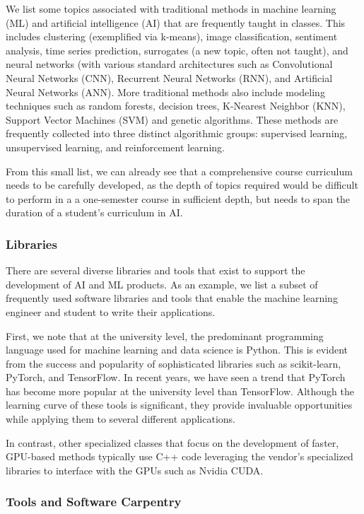 \documentclass[utf8]{FrontiersinVancouver} %
\begin{document}
We list some topics associated with traditional methods in machine
learning (ML) and artificial intelligence (AI) that are frequently
taught in classes. This includes clustering (exemplified via k-means),
image classification, sentiment analysis, time series prediction,
surrogates (a new topic, often not taught), and neural networks (with
various standard architectures such as Convolutional Neural Networks
(CNN), Recurrent Neural Networks (RNN), and Artificial Neural Networks
(ANN).  More traditional methods also include modeling techniques such
as random forests, decision trees, K-Nearest Neighbor (KNN), Support
Vector Machines (SVM) and genetic algorithms.  These methods are
frequently collected into three distinct algorithmic groups:
supervised learning, unsupervised learning, and reinforcement
learning.

From this small list, we can already see that a comprehensive course
curriculum needs to be carefully developed, as the depth of topics required would be difficult to perform in a
a one-semester course in sufficient depth, but needs to span the
duration of a student's curriculum in AI.

\subsubsection{Libraries}

There are several diverse libraries and tools that exist to support
the development of AI and ML products.  As an example, we list a
subset of frequently used software libraries and tools that enable the
machine learning engineer and student to write their applications.

First, we note that at the university level, the predominant
programming language used for machine learning and data science is
Python. This is evident from the success and popularity of
sophisticated libraries such as scikit-learn, PyTorch, and
TensorFlow. In recent years, we have seen a trend that PyTorch has
become more popular at the university level than TensorFlow.  Although
the learning curve of these tools is significant, they provide
invaluable opportunities while applying them to several different
applications.

In contrast, other specialized classes that focus on the development
of faster, GPU-based methods typically use C++ code leveraging the
vendor's specialized libraries to interface with the GPUs such as
Nvidia CUDA.

\subsubsection{Tools and Software Carpentry}\label{sec:tools}
\end{document}
